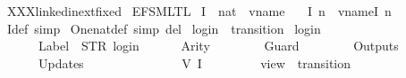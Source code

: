 %
\begin{isabellebody}%
%
%
\isadelimtheory
%
\endisadelimtheory
%
\isatagtheory
{}\isamarkupfalse%
\ XXXlinkedin{\isacharunderscore}ext{\isacharunderscore}fixed\isanewline
{}\ {\isachardoublequoteopen}{\isachardot}{\isachardot}{\isacharslash}{\isachardot}{\isachardot}{\isacharslash}EFSM{\isacharunderscore}LTL{\isachardoublequoteclose}\isanewline
{}%
\endisatagtheory
{\isafoldtheory}%
%
\isadelimtheory
\isanewline
%
\endisadelimtheory
\isanewline
{}\isamarkupfalse%
\ I\ {\isacharcolon}{\isacharcolon}\ {\isachardoublequoteopen}nat\ {\isasymRightarrow}\ vname{\isachardoublequoteclose}\ \isanewline
\ \ {\isachardoublequoteopen}I\ n\ {\isacharequal}\ vname{\isachardot}I\ {\isacharparenleft}n{\isacharminus}{}{\isacharparenright}{\isachardoublequoteclose}\isanewline
{}\isamarkupfalse%
\ I{\isacharunderscore}def\ {\isacharbrackleft}simp{\isacharbrackright}\isanewline
\isanewline
{}\isamarkupfalse%
\ One{\isacharunderscore}nat{\isacharunderscore}def\ {\isacharbrackleft}simp\ del{\isacharbrackright}\isanewline
\isanewline
{}\isamarkupfalse%
\ {\isachardoublequoteopen}login{\isachardoublequoteclose}\ {\isacharcolon}{\isacharcolon}\ {\isachardoublequoteopen}transition{\isachardoublequoteclose}\ \isanewline
{\isachardoublequoteopen}login\ {\isasymequiv}\ {\isasymlparr}\isanewline
\ \ \ \ \ \ Label\ {\isacharequal}\ STR\ {\isacharprime}{\isacharprime}login{\isacharprime}{\isacharprime}{\isacharcomma}\isanewline
\ \ \ \ \ \ Arity\ {\isacharequal}\ {}{\isacharcomma}\isanewline
\ \ \ \ \ \ Guard\ {\isacharequal}\ {\isacharbrackleft}{\isacharbrackright}{\isacharcomma}\isanewline
\ \ \ \ \ \ Outputs\ {\isacharequal}\ {\isacharbrackleft}{\isacharbrackright}{\isacharcomma}\isanewline
\ \ \ \ \ \ Updates\ {\isacharequal}\ {\isacharbrackleft}\isanewline
\ \ \ \ \ \ \ \ \ \ \ \ {\isacharparenleft}{}{\isacharcomma}\ {\isacharparenleft}V\ {\isacharparenleft}I\ {}{\isacharparenright}{\isacharparenright}{\isacharparenright}\isanewline
\ \ \ \ \ \ {\isacharbrackright}\isanewline
{\isasymrparr}{\isachardoublequoteclose}\isanewline
\isanewline
{}\isamarkupfalse%
\ {\isachardoublequoteopen}view{\isachardoublequoteclose}\ {\isacharcolon}{\isacharcolon}\ {\isachardoublequoteopen}transition{\isachardoublequoteclose}\ \isanewline

\end{isabellebody}
